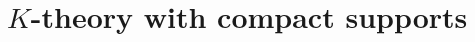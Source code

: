 \documentclass[dvipdfmx]{jsarticle}
\begin{document}
\section{\(K\)-theory with compact supports}

\end{document}
